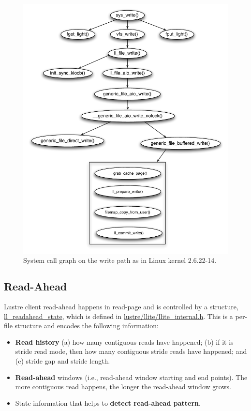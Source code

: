 \begin{figure}[htb]
\centering
\includegraphics[width=4.5in]{img/lite_write}
\caption{System call graph on the write path as in Linux kernel 2.6.22-14.}
\end{figure}


\subsection{Read-Ahead}

Lustre client read-ahead happens in read-page and is controlled by a
structure, \url{ll_readahead_state}, which is defined in
\url{lustre/llite/llite_internal.h}. This is a per-file structure and encodes
the following information:

\begin{itemize} 

\item \textbf{Read history} (a) how many contiguous reads have happened; (b)
if it is stride read mode, then how many contiguous stride reads have happened;
and (c) stride gap and stride length.

\item \textbf{Read-ahead} windows (i.e., read-ahead window starting and end
points). The more contiguous read happens, the longer the read-ahead window
grows.

\item State information that helps to \textbf{detect read-ahead pattern}.

\end{itemize}

